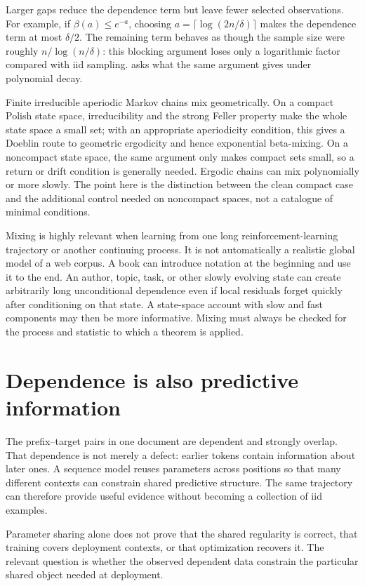 \documentclass[11pt,twoside]{article}
\theoremstyle{definition}
\theoremstyle{remark}
\begin{document}
Larger gaps reduce the dependence term but leave fewer selected observations.
For example, if \(\beta(a)\leq e^{-a}\), choosing
\(a=\lceil\log(2n/\delta)\rceil\) makes the dependence term at most
\(\delta/2\). The remaining term behaves as though the sample size were
roughly \(n/\log(n/\delta)\): this blocking argument loses only a logarithmic
factor compared with iid sampling.  asks what the
same argument gives under polynomial decay.

Finite irreducible aperiodic Markov chains mix geometrically. On a compact
Polish state space, irreducibility and the strong Feller property make the
whole state space a small set; with an appropriate aperiodicity condition,
this gives a Doeblin route to geometric ergodicity and hence exponential
beta-mixing. On a noncompact state space, the same argument only makes compact
sets small, so a return or drift condition is generally needed. Ergodic chains
can mix polynomially or more slowly. The point here is the distinction between
the clean compact case and the additional control needed on noncompact spaces,
not a catalogue of minimal conditions.

Mixing is highly relevant when learning from one long reinforcement-learning
trajectory or another continuing process. It is not automatically a realistic
global model of a web corpus. A book can introduce notation at the beginning
and use it to the end. An author, topic, task, or other slowly evolving state
can create arbitrarily long unconditional dependence even if local residuals
forget quickly after conditioning on that state. A state-space account with
slow and fast components may then be more informative. Mixing must always be
checked for the process and statistic to which a theorem is applied.

\section{Dependence is also predictive information}
\label{sec:signal}

The prefix--target pairs in one document are dependent and strongly overlap.
That dependence is not merely a defect: earlier tokens contain information
about later ones. A sequence model reuses parameters across positions so that
many different contexts can constrain shared predictive structure. The same
trajectory can therefore provide useful evidence without becoming a collection
of iid examples.

Parameter sharing alone does not prove that the shared regularity is correct,
that training covers deployment contexts, or that optimization recovers it.
The relevant question is whether the observed dependent data constrain the
particular shared object needed at deployment.
\end{document}

